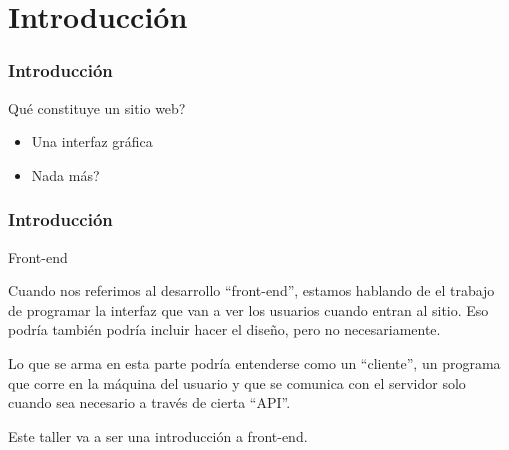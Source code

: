 \section{Introducción}\label{sec:Introducción}

\begin{frame}
    \frametitle{Introducción}
    \begin{tcolorbox}[colframe=color1]
        \begin{center}
        Qué constituye un sitio web?
        \end{center}
    \end{tcolorbox}
    \begin{itemize}
        \item Una interfaz gráfica
        \item Nada más?
    \end{itemize}
\end{frame}

\begin{frame}
\frametitle{Introducción}
    \begin{tcolorbox}[colframe=color1]
        \begin{center}
            Front-end
        \end{center}
    \end{tcolorbox}
    
    Cuando nos referimos al desarrollo ``front-end'', estamos hablando
    de el trabajo de programar la interfaz que van a ver los usuarios 
    cuando entran al sitio. Eso podría también podría incluir hacer 
    el diseño, pero no necesariamente. 
    
    Lo que se arma en esta parte podría entenderse como un ``cliente'', un 
    programa que corre en la máquina del usuario y que se comunica 
    con el servidor solo cuando sea necesario a través de cierta ``API''.

    Este taller va a ser una introducción a front-end.

\end{frame}

